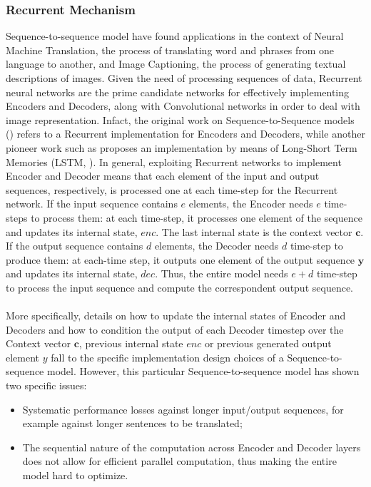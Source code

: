             \subsubsection{Recurrent Mechanism}
            \label{subsub:seq2seq_rnn}
                Sequence-to-sequence model have found applications in the context of Neural Machine Translation, the process of translating word and phrases from one language to another, and Image Captioning, the process of generating textual descriptions of images. Given the need of processing sequences of data, Recurrent neural networks are the prime candidate networks for effectively implementing Encoders and Decoders, along with Convolutional networks in order to deal with image representation. Infact, the original work on Sequence-to-Sequence models () refers to a Recurrent implementation for Encoders and Decoders, while another pioneer work such as  proposes an implementation by means of Long-Short Term Memories (LSTM, ). \newline
                In general, exploiting Recurrent networks to implement Encoder and Decoder means that each element of the input and output sequences, respectively, is processed one at each time-step for the Recurrent network. If the input sequence contains $e$ elements, the Encoder needs $e$ time-steps to process them: at each time-step, it processes one element of the sequence and updates its internal state, $enc$. The last internal state is the context vector $\mathbf{c}$. If the output sequence contains $d$ elements, the Decoder needs $d$ time-step to produce them: at each-time step, it outputs one element of the output sequence $\mathbf{y}$ and updates its internal state, $dec$. Thus, the entire model needs $e+d$ time-step to process the input sequence and compute the correspondent output sequence.
                \\\\
                More specifically, details on how to update the internal states of Encoder and Decoders and how to condition the output of each Decoder timestep over the Context vector $\mathbf{c}$, previous internal state $enc$ or previous generated output element $y$ fall to the specific implementation design choices of a Sequence-to-sequence model. However, this particular Sequence-to-sequence model has shown two specific issues:
                \begin{itemize}[topsep=0.5em, partopsep=0.5em]
                    \setlength\itemsep{0em}
                    \item Systematic performance losses against longer input/output sequences, for example against longer sentences to be translated;
                    \item The sequential nature of the computation across Encoder and Decoder layers does not allow for efficient parallel computation, thus making the entire model hard to optimize.
                \end{itemize}
                
